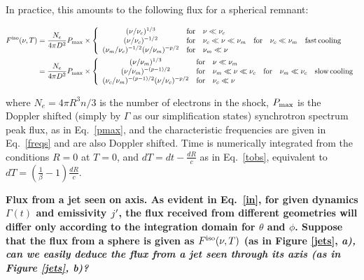 In practice, this amounts to the following flux for a spherical remnant:

\begin{align}\label{flux}
F^{\rm{iso}}(\nu, T) &= \frac{N_e}{4\pi D^2} P_{\rm{max}} \times \left\{ \begin{array}{clllll}
                                    (\nu/\nu_c)^{1/3} & \rm{for} & \nu \ll \nu_c & & & \\
                                    (\nu/\nu_c)^{-1/2} & \rm{for} & \nu_c \ll \nu \ll \nu_m & \rm{for} & \nu_c \ll \nu_m & \rm{fast\,cooling} \\
                                    (\nu_m/\nu_c)^{-1/2}(\nu/\nu_m)^{-p/2} & \rm{for} & \nu_m \ll \nu & & & \\
                                    \end{array}\right. \\
                   &= \frac{N_e}{4\pi D^2} P_{\rm{max}} \times \left\{ \begin{array}{clllll}
                                    (\nu/\nu_m)^{1/3} & \rm{for} & \nu \ll \nu_m & & &\\
                                    (\nu/\nu_m)^{-(p-1)/2} & \rm{for} & \nu_m \ll \nu \ll \nu_c & \rm{for} & \nu_m \ll \nu_c &\rm{slow\,cooling} \\
                                    (\nu_c/\nu_m)^{-(p-1)/2}(\nu/\nu_c)^{-p/2} & \rm{for} & \nu_c \ll \nu & & & \\
                                    \end{array}\right.
\end{align}

where $N_e = 4 \pi R^3 n / 3$ is the number of electrons in the shock, $P_\rm{max}$ is the Doppler shifted (simply by $\Gamma$ as our simplification states) synchrotron spectrum peak flux, as in Eq.~\ref{pmax}, and the characteristic frequencies are given in Eq.~\ref{freqs} and are also Doppler shifted. Time is numerically integrated from the conditions $R = 0$ at $T = 0$, and $dT = dt - \frac{dR}{c}$ as in Eq.~\ref{tobs}, equivalent to $dT = \left( \frac{1}{\beta} - 1\right)\frac{dR}{c}$.


\bf{Flux from a jet seen on axis.} As evident in Eq.~\ref{in}, for given dynamics $\Gamma(t)$ and emissivity $j\p$, the flux received from different geometries will differ only according to the integration domain for $\theta$ and $\phi$. Suppose that the flux from a sphere is given as $F^\rm{iso}(\nu, T)$ (as in Figure \ref{jets}, \it{a}), can we easily deduce the flux from a jet seen through its axis (as in Figure \ref{jets}, \it{b})?

